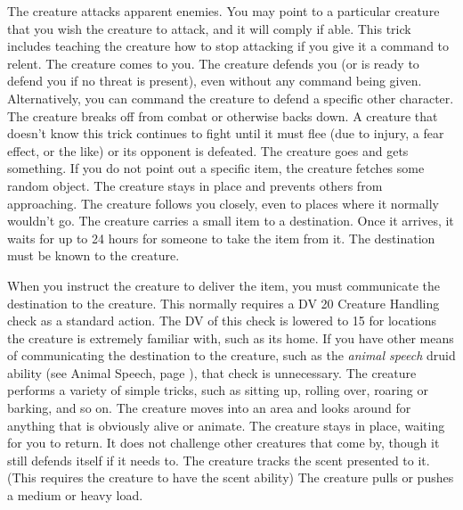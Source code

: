      The creature attacks apparent enemies. You may point to a particular creature that you wish the creature to attack, and it will comply if able. This trick includes teaching the creature how to stop attacking if you give it a command to relent.
     The creature comes to you.
     The creature defends you (or is ready to defend you if no threat is present), even without any command being given. Alternatively, you can command the creature to defend a specific other character.
     The creature breaks off from combat or otherwise backs down. A creature that doesn't know this trick continues to fight until it must flee (due to injury, a fear effect, or the like) or its opponent is defeated.
     The creature goes and gets something. If you do not point out a specific item, the creature fetches some random object.
     The creature stays in place and prevents others from approaching.
     The creature follows you closely, even to places where it normally wouldn't go.
     The creature carries a small item to a destination.
    Once it arrives, it waits for up to 24 hours for someone to take the item from it.
    The destination must be known to the creature.
    \par When you instruct the creature to deliver the item, you must communicate the destination to the creature.
    This normally requires a DV 20 Creature Handling check as a standard action.
    The DV of this check is lowered to 15 for locations the creature is extremely familiar with, such as its home.
    If you have other means of communicating the destination to the creature, such as the \textit{animal speech} druid ability (see Animal Speech, page ), that check is unnecessary.
     The creature performs a variety of simple tricks, such as sitting up, rolling over, roaring or barking, and so on.
     The creature moves into an area and looks around for anything that is obviously alive or animate.
     The creature stays in place, waiting for you to return. It does not challenge other creatures that come by, though it still defends itself if it needs to.
     The creature tracks the scent presented to it. (This requires the creature to have the scent ability)
     The creature pulls or pushes a medium or heavy load.

